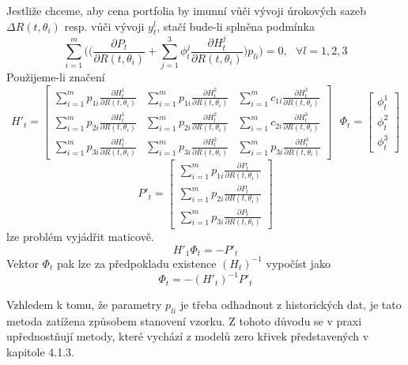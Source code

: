 \documentclass[a4paper]{book}
\begin{document}
Jestliže chceme, aby cena portfolia by imunní vůči vývoji úrokových sazeb $\Delta R(t, \theta_i)$ resp. vůči vývoji $y_t^l$, stačí bude-li splněna podmínka
\begin{equation*}
\sum_{i=1}^m \Big( \Big( \frac{\partial P_t}{\partial R(t, \theta_i)} + \sum_{j=1}^3 \phi_t^j \frac{\partial H_t^j}{\partial R(t, \theta_i)}\Big) p_{li} \Big) = 0, ~~~ \forall l = 1,2,3
\end{equation*}
Použijeme-li značení
\begin{equation*}
H'_t =
\begin{bmatrix}
\sum_{i=1}^m p_{1i} \frac{\partial H_t^1}{\partial R(t,\theta_i)} & \sum_{i=1}^m p_{1i} \frac{\partial H_t^2}{\partial R(t,\theta_i)} & \sum_{i=1}^m c_{1i} \frac{\partial H_t^3}{\partial R(t,\theta_i)}\\
\sum_{i=1}^m p_{2i} \frac{\partial H_t^1}{\partial R(t,\theta_i)} & \sum_{i=1}^m p_{2i} \frac{\partial H_t^2}{\partial R(t,\theta_i)} & \sum_{i=1}^m c_{2i} \frac{\partial H_t^3}{\partial R(t,\theta_i)}\\
\sum_{i=1}^m p_{3i} \frac{\partial H_t^1}{\partial R(t,\theta_i)} & \sum_{i=1}^m p_{3i} \frac{\partial H_t^2}{\partial R(t,\theta_i)} & \sum_{i=1}^m p_{3i} \frac{\partial H_t^3}{\partial R(t,\theta_i)}
\end{bmatrix}
~~~
\Phi_t =
\begin{bmatrix}
\phi_t^1 \\
\phi_t^2 \\
\phi_t^3
\end{bmatrix}
\end{equation*}
\begin{equation*}
P'_t =
\begin{bmatrix}
\sum_{i=1}^m p_{1i}\frac{\partial P_t}{\partial R(t, \theta_i)}\\
\sum_{i=1}^m p_{2i}\frac{\partial P_t}{\partial R(t, \theta_i)}\\
\sum_{i=1}^m p_{3i}\frac{\partial P_t}{\partial R(t, \theta_i)}
\end{bmatrix}
\end{equation*}
lze problém vyjádřit maticově.
\begin{equation*}
H'_1 \Phi_t = - P'_t
\end{equation*}
Vektor $\Phi_t$ pak lze za předpokladu existence $(H_t)^{-1}$ vypočíst jako
\begin{equation*}
\Phi_t = - (H'_t)^{-1}P'_t
\end{equation*}

Vzhledem k tomu, že parametry $p_{li}$ je třeba odhadnout z historických dat, je tato metoda zatížena způsobem stanovení vzorku. Z tohoto důvodu se v praxi upřednostňují metody, které vychází z modelů zero křivek představených v kapitole 4.1.3.
\end{document}
